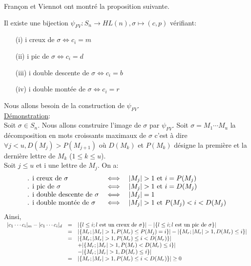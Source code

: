 		Françon et Viennot ont montré la proposition suivante. %
		\begin{proposition}
			Il existe une 
			bijection $\psi_{FV}:S_{n}\longrightarrow HL(n), \sigma \longmapsto (c,p)$ vérifiant:
			\begin{itemize}
				\item[(i)] i creux de $\sigma \iff c_{i}=m$
				\item[(ii)] i pic de $\sigma \iff c_{i}=d$
				\item[(iii)] i double descente de $\sigma \iff c_{i}=b$
				\item[(iv)] i double montée de $\sigma \iff c_{i}=r$
			\end{itemize}
		\end{proposition}
		Nous allons besoin de la construction de $\psi_{FV} $.\\
		\underline{Démonstration}:\\
			Soit $\sigma \in S_{n}$. Nous allons construire l'image de $\sigma$ par $\psi_{FV} $. Soit $\sigma = M_{1} \cdots M_{u} $ la décomposition en mots croissants maximaux de $\sigma$ c'est à dire $\forall j<u, D(M_{j}) > P(M_{j+1}) $ où $D(M_{k})$ et  $P(M_{k})$ désigne la première et la dernière lettre de $M_{k}$
			($1 \leq k \leq u$).\\
			Soit $j \leq u$ et i une lettre de $M_{j}$. On a:\\
			$$
			\begin{array} {l l l}
				\text{. i creux de }\sigma &\iff& |M_{j}| > 1 \text{ et } i = P(M_{j})\\
				\text{. i pic de }\sigma &\iff& |M_{j}| > 1 \text{ et } i = D(M_{j})\\
				\text{. i double descente de }\sigma &\iff& |M_{j}| = 1 \\
				\text{. i double montée de }\sigma &\iff& |M_{j}| > 1 \text{ et } P(M_{j})<i<D(M_{j})
			\end{array}
			$$
			Ainsi,\\
			$
			\begin{array}{c c l}
			|c_{1}\cdots c_{i}|_{m}-|c_{1}\cdots c_{i}|_{d}&=&| \{ l\leq i;l \text{ est un creux de }\sigma \} |-|\{ l\leq i;l \text{ est un pic de }\sigma \}|\\
			&=&| \{ M_{r};|M_{r}|>1, P(M_{r})\leq P(M_{j})=i\} |-| \{ M_{r};|M_{r}|>1, D(M_{r})\leq i\} |\\
			&=&| \{ M_{r};|M_{r}|>1, P(M_{r})\leq i<D(M_{r})\} |\\& &+| \{ M_{r};|M_{r}|>1, P(M_{r})<D(M_{r})\leq i\} |\\& &-| \{ M_{r};|M_{r}|>1, D(M_{r})\leq i\} |\\
			&=&| \{ M_{r};|M_{r}|>1, P(M_{r})\leq i<D(M_{r})\}|\geq0
			\end{array}
			$\\

